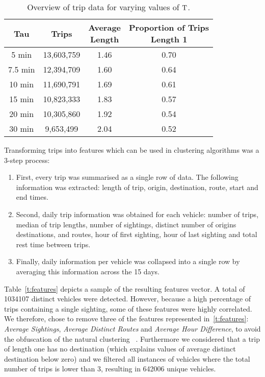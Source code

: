\begin{table}[t]
\centering
\tabcolsep=0.25cm
\begin{tabular}{c c c c}
  \hline
Tau & Trips & \thead{Average\\Length} & \thead{Proportion of Trips \\ Length 1} \\
  \hline
5 min & 13,603,759 & 1.46 & 0.70 \\
7.5 min & 12,394,709 & 1.60 & 0.64 \\
10 min & 11,690,791 & 1.69 & 0.61 \\
15 min & 10,823,333 & 1.83 & 0.57 \\
20 min & 10,305,860 & 1.92 & 0.54 \\
30 min &  9,653,499 & 2.04 & 0.52 \\
   \hline
\end{tabular}
\caption{Overview of trip data for varying values of $\mathrm{T}$.}
\label{t:trips-tau}
\end{table}

Transforming trips into features which can be used in clustering algorithms was a 3-step process:
\begin{enumerate}
  \item First, every trip was summarised as a single row of data. The following information was extracted: length of trip, origin, destination, route, start and end times.
  \item Second, daily trip information was obtained for each vehicle: number of trips, median of trip lengths, number of sightings, distinct number of origins destinations, and routes, hour of first sighting, hour of last sighting and total rest time between trips.
  \item Finally, daily information per vehicle was collapsed into a single row by averaging this information across the 15 days.
\end{enumerate}

Table~\ref{t:features} depicts a sample of the resulting features vector. A total of 1034107 distinct vehicles were detected. However, because a high percentage of trips containing a single sighting, some of these features were highly correlated. We therefore, chose to remove three of the features represented in~\ref{t:features}: \emph{Average Sightings}, \emph{Average Distinct Routes} and \emph{Average Hour Difference}, to avoid the obfuscation of the natural clustering ~\cite{Kmeans}. Furthermore we considered that a trip of length one has no destination (which explains values of average distinct destination below zero) and we filtered all instances of vehicles where the total number of trips is lower than 3, resulting in 642006 unique vehicles.

